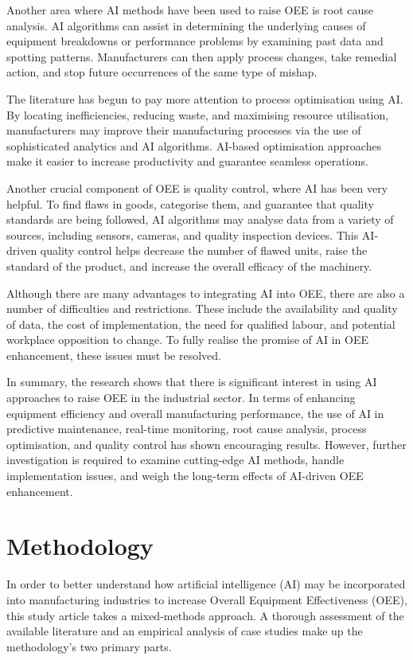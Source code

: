 \documentclass[12pt]{article}
\begin{document}
Another area where AI methods have been used to raise OEE is root cause analysis. AI algorithms can assist in determining the underlying causes of equipment breakdowns or performance problems by examining past data and spotting patterns. Manufacturers can then apply process changes, take remedial action, and stop future occurrences of the same type of mishap.


The literature has begun to pay more attention to process optimisation using AI. By locating inefficiencies, reducing waste, and maximising resource utilisation, manufacturers may improve their manufacturing processes via the use of sophisticated analytics and AI algorithms. AI-based optimisation approaches make it easier to increase productivity and guarantee seamless operations.

Another crucial component of OEE is quality control, where AI has been very helpful. To find flaws in goods, categorise them, and guarantee that quality standards are being followed, AI algorithms may analyse data from a variety of sources, including sensors, cameras, and quality inspection devices. This AI-driven quality control helps decrease the number of flawed units, raise the standard of the product, and increase the overall efficacy of the machinery.


Although there are many advantages to integrating AI into OEE, there are also a number of difficulties and restrictions. These include the availability and quality of data, the cost of implementation, the need for qualified labour, and potential workplace opposition to change. To fully realise the promise of AI in OEE enhancement, these issues must be resolved.

In summary, the research shows that there is significant interest in using AI approaches to raise OEE in the industrial sector. In terms of enhancing equipment efficiency and overall manufacturing performance, the use of AI in predictive maintenance, real-time monitoring, root cause analysis, process optimisation, and quality control has shown encouraging results. However, further investigation is required to examine cutting-edge AI methods, handle implementation issues, and weigh the long-term effects of AI-driven OEE enhancement.


\section{Methodology}
In order to better understand how artificial intelligence (AI) may be incorporated into manufacturing industries to increase Overall Equipment Effectiveness (OEE), this study article takes a mixed-methods approach. A thorough assessment of the available literature and an empirical analysis of case studies make up the methodology's two primary parts.
\end{document}
